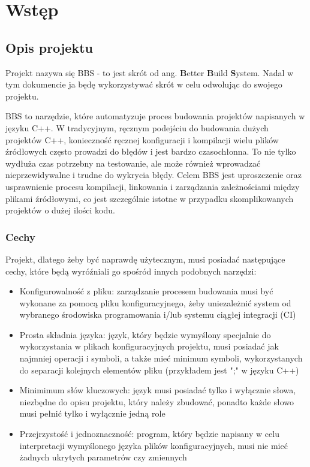 \chapter{Wstęp}
\section{Opis projektu}

Projekt nazywa się BBS - to jest skrót od ang. \textbf{B}etter \textbf{B}uild \textbf{S}ystem. Nadal w tym dokumencie ja będę wykorzystywać skrót w celu odwolując do swojego projektu.

BBS to narzędzie, które automatyzuje proces budowania projektów napisanych w języku C++. W tradycyjnym, ręcznym podejściu do budowania dużych projektów C++, konieczność ręcznej konfiguracji i kompilacji wielu plików źródłowych często prowadzi do błędów i jest bardzo czasochłonna. To nie tylko wydłuża czas potrzebny na testowanie, ale może również wprowadzać nieprzewidywalne i trudne do wykrycia błędy. Celem BBS jest uproszczenie oraz usprawnienie procesu kompilacji, linkowania i zarządzania zależnościami między plikami źródłowymi, co jest szczególnie istotne w przypadku skomplikowanych projektów o dużej ilości kodu.

\subsection{Cechy}
Projekt, dlatego żeby być naprawdę użytecznym, musi posiadać następujące cechy, które będą wyróźniali go spośród innych podobnych narzędzi:

\begin{itemize}
    \item Konfigurowalność z pliku: zarządzanie procesem budowania musi być wykonane za pomocą pliku konfiguracyjnego, żeby uniezależnić system od wybranego środowiska programowania i/lub systemu ciągłej integracji (CI)
    \item Prosta składnia języka: język, który będzie wymyślony specjalnie do wykorzystania w plikach konfiguracyjnych projektu, musi posiadać jak najmniej operacji i symboli, a także mieć minimum symboli, wykorzystanych do separacji kolejnych elementów pliku (przykładem jest ";" w języku C++)
    \item Minimimum słów kluczowych: język musi posiadać tylko i wyłącznie słowa, niezbędne do opisu projektu, który należy zbudować, ponadto każde słowo musi pełnić tylko i wyłącznie jedną role
    \item Przejrzystość i jednoznaczność: program, który będzie napisany w celu interpretacji wymyślonego języka plików konfiguracyjnych, musi nie mieć żadnych ukrytych parametrów czy zmiennych
\end{itemize}

